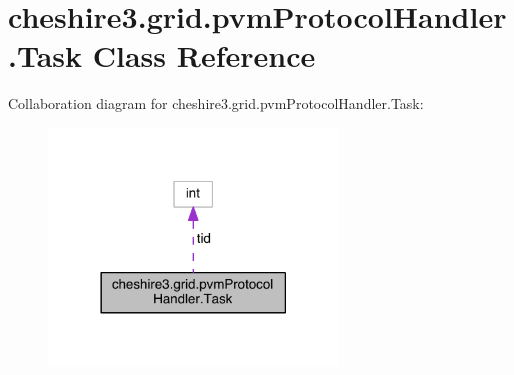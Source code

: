 \hypertarget{classcheshire3_1_1grid_1_1pvm_protocol_handler_1_1_task}{\section{cheshire3.\-grid.\-pvm\-Protocol\-Handler.\-Task Class Reference}
\label{classcheshire3_1_1grid_1_1pvm_protocol_handler_1_1_task}
}


Collaboration diagram for cheshire3.\-grid.\-pvm\-Protocol\-Handler.\-Task\-:
\nopagebreak
\begin{figure}[H]
\begin{center}
\leavevmode
\includegraphics[width=218pt]{classcheshire3_1_1grid_1_1pvm_protocol_handler_1_1_task__coll__graph}
\end{center}
\end{figure}
